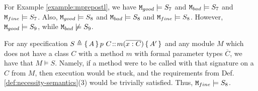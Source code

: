  
 \begin{example}
 \label{example:mprepostlsatissy}
 For  %
 Example \ref{example:mprepostl}, we have
  $\mbox{\normalfont{\texttt{M}}}_{{good}} \models S_7$ and $\mbox{\normalfont{\texttt{M}}}_{{bad}} \models S_7$ and  $\mbox{\normalfont{\texttt{M}}}_{{fine}} \models S_7$.
Also,  $\mbox{\normalfont{\texttt{M}}}_{{good}} \models S_8$ and $\mbox{\normalfont{\texttt{M}}}_{{bad}} \models S_8$ and  $\mbox{\normalfont{\texttt{M}}}_{{fine}} \models S_8$.
However,   $\mbox{\normalfont{\texttt{M}}}_{{good}}  \models S_9$, while $\mbox{\normalfont{\texttt{M}}}_{{bad}}  \not\models S_9$.
\end{example}

 \begin{example}
\label{example:mprepostlsatissy}
 For  %
any   specification  $S \triangleq {\ensuremath{ \{\, A\, \}\, p\ C\!::\!m(\overline{x:C})\, \{\, A'\, \} } }$ and any module  $M$ which does not have a class $C$  with a method $m$ with formal parameter  types ${\overline C}$, we have that $M \models S$.
Namely, if a method were to be called with that signature on a $C$  from $M$, then execution would be stuck, and the requirements from Def. \ref{def:necessity-semantics}(3) would be trivially satisfied.
Thus,   $\mbox{\normalfont{\texttt{M}}}_{{fine}} \models S_8$. %
\end{example}


 
